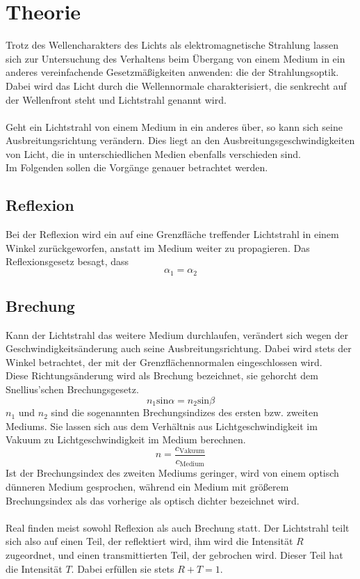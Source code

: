 \section{Theorie}
\label{sec:Theorie}
Trotz des Wellencharakters des Lichts als elektromagnetische Strahlung
lassen sich zur Untersuchung des Verhaltens beim Übergang von einem Medium
in ein anderes vereinfachende Gesetzmäßigkeiten anwenden: die der Strahlungsoptik.\\
Dabei wird das Licht durch die Wellennormale charakterisiert, die senkrecht auf der
Wellenfront steht und Lichtstrahl genannt wird.\\
\\
Geht ein Lichtstrahl von einem Medium in ein anderes über, so kann sich seine
Ausbreitungsrichtung verändern. Dies liegt an den Ausbreitungsgeschwindigkeiten
von Licht, die in unterschiedlichen Medien ebenfalls verschieden sind.\\
Im Folgenden sollen die Vorgänge genauer betrachtet werden.

\subsection{Reflexion}
Bei der Reflexion wird ein auf eine Grenzfläche treffender Lichtstrahl
in einem Winkel zurückgeworfen, anstatt im Medium weiter zu propagieren.
Das Reflexionsgesetz besagt, dass
\begin{equation}
    \alpha_1 = \alpha_2
    \label{eqn:reflexion}
\end{equation}

\subsection{Brechung}
Kann der Lichtstrahl das weitere Medium durchlaufen, verändert sich wegen
der Geschwindigkeitsänderung auch seine Ausbreitungsrichtung. Dabei wird stets
der Winkel betrachtet, der mit der Grenzflächennormalen eingeschlossen wird.\\
Diese Richtungsänderung wird als Brechung bezeichnet, sie gehorcht dem Snellius'schen
Brechungsgesetz.
\begin{equation}
    n_1 \text{sin} \alpha = n_2 \text{sin} \beta
    \label{eqn:snellius}
\end{equation}
$n_1$ und $n_2$ sind die sogenannten Brechungsindizes des ersten bzw. zweiten
Mediums. Sie lassen sich aus dem Verhältnis aus Lichtgeschwindigkeit im Vakuum 
zu Lichtgeschwindigkeit im Medium berechnen.
\begin{equation}
    n = \frac{c_\text{Vakuum}}{c_\text{Medium}}
    \label{eqn:brech}
\end{equation}
Ist der Brechungsindex des zweiten Mediums geringer, wird von 
einem optisch dünneren Medium gesprochen, während ein Medium mit größerem
Brechungsindex als das vorherige als optisch dichter bezeichnet wird.\\
\\
Real finden meist sowohl Reflexion als auch Brechung statt. Der Lichtstrahl teilt
sich also auf einen Teil, der reflektiert wird, ihm wird die Intensität $R$ zugeordnet,
und einen transmittierten Teil, der gebrochen wird. Dieser Teil hat die
Intensität $T$. Dabei erfüllen sie stets $R + T = 1$.

